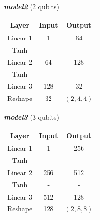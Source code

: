 \begin{table}[htbp]
\centering
\renewcommand{\arraystretch}{1.2}

\begin{minipage}[t]{0.48\textwidth}
\centering
\textbf{\textit{model2}} (2 qubits)\\[0.5ex]
\begin{tabular}{c|c|c}
\hline
\textbf{Layer} & \textbf{Input} & \textbf{Output} \\
\hline \hline
Linear 1 & 1 & 64 \\
Tanh & - & - \\
Linear 2 & 64 & 128 \\
Tanh & - & - \\
Linear 3 & 128 & 32 \\
Reshape & 32 & $(2,4,4)$ \\
\hline
\end{tabular}
\end{minipage}
\hfill
\begin{minipage}[t]{0.48\textwidth}
\centering
\textbf{\textit{model3}} (3 qubits)\\[0.5ex]
\begin{tabular}{c|c|c}
\hline
\textbf{Layer} & \textbf{Input} & \textbf{Output} \\
\hline \hline
Linear 1 & 1 & 256 \\
Tanh & - & - \\
Linear 2 & 256 & 512 \\
Tanh & - & - \\
Linear 3 & 512 & 128 \\
Reshape & 128 & $(2,8,8)$ \\
\hline
\end{tabular}
\end{minipage}

\medskip


\end{table}
